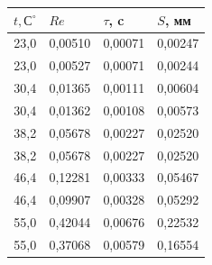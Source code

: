 \documentclass[12pt,a4paper]{article}
\begin{document}
\begin{enumerate}
\begin{table}[h!]
\begin{tabular}{|c|c|c|c|}
\hline
\multicolumn{1}{|l|}{$t, С^\circ$} & \multicolumn{1}{l|}{$Re$} & \multicolumn{1}{l|}{$\tau$, c} & \multicolumn{1}{l|}{$S$, мм} \\ \hline
23,0                         & 0,00510                 & 0,00071                   & 0,00247                    \\ \hline
23,0                         & 0,00527                 & 0,00071                   & 0,00244                    \\ \hline
30,4                       & 0,01365                 & 0,00111                   & 0,00604                    \\ \hline
30,4                       & 0,01362                 & 0,00108                   & 0,00573                    \\ \hline
38,2                       & 0,05678                 & 0,00227                   & 0,02520                    \\ \hline
38,2                       & 0,05678                 & 0,00227                   & 0,02520                    \\ \hline
46,4                       & 0,12281                 & 0,00333                   & 0,05467                    \\ \hline
46,4                       & 0,09907                 & 0,00328                   & 0,05292                    \\ \hline
55,0                         & 0,42044                 & 0,00676                   & 0,22532                    \\ \hline
55,0                         & 0,37068                 & 0,00579                   & 0,16554                    \\ \hline
\end{tabular}
\end{table}



\end{enumerate}
\end{document}
